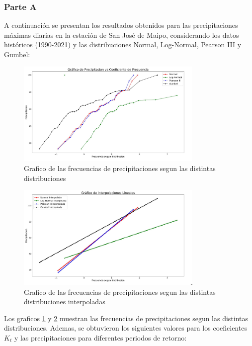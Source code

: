 \documentclass{article}  %
\begin{document}
\subsubsection*{Parte A}

A continuación se presentan los resultados obtenidos para las precipitaciones máximas diarias en la estación de San José de Maipo, considerando los datos históricos (1990-2021) y las distribuciones Normal, Log-Normal, Pearson III y Gumbel:

\begin{figure}[H]
  \centering
  \includegraphics[width=0.8\textwidth]{grafico.jpg}
  \caption{Grafico de las frecuencias de precipitaciones segun las distintas distribuciones}
  \label{fig:grafico}
\end{figure}

\begin{figure}[H]
  \centering
  \includegraphics[width=0.8\textwidth]{grafico_interpolado.jpg}
  \caption{Grafico de las frecuencias de precipitaciones segun las distintas distribuciones interpoladas}
  \label{fig:grafico_interpolado}
\end{figure}

Los graficos \ref{fig:grafico} y \ref{fig:grafico_interpolado} muestran las frecuencias de precipitaciones segun las distintas distribuciones. Ademas, se obtuvieron los siguientes valores para los coeficientes \( K_t \) y las precipitaciones para diferentes periodos de retorno:
\end{document}
